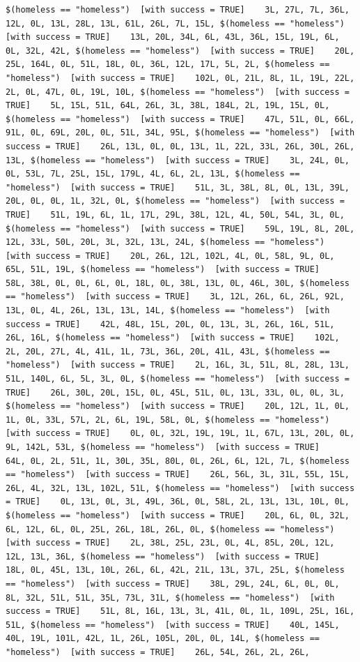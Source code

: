 \documentclass{tufte-book}\usepackage[]{graphicx}\usepackage[]{xcolor}
\makeatletter
\newenvironment{kframe}{%
 \def\at@end@of@kframe{}%
 \ifinner\ifhmode%
  \def\at@end@of@kframe{\end{minipage}}%
  \begin{minipage}{\columnwidth}%
 \fi\fi%
 \def\FrameCommand##1{\hskip\@totalleftmargin \hskip-\fboxsep
 \colorbox{shadecolor}{##1}\hskip-\fboxsep
     \hskip-\linewidth \hskip-\@totalleftmargin \hskip\columnwidth}%
 \MakeFramed {\advance\hsize-\width
   \@totalleftmargin\z@ \linewidth\hsize
   \@setminipage}}%
 {\par\unskip\endMakeFramed%
 \at@end@of@kframe}
\newenvironment{knitrout}{}{} %
\makeatother
\begin{document}
\begin{knitrout}
\begin{kframe}
\begin{verbatim}
$(homeless == "homeless")  [with success = TRUE]    3L, 27L, 7L, 36L, 12L, 0L, 13L, 28L, 13L, 61L, 26L, 7L, 15L, $(homeless == "homeless")  [with success = TRUE]    13L, 20L, 34L, 6L, 43L, 36L, 15L, 19L, 6L, 0L, 32L, 42L, $(homeless == "homeless")  [with success = TRUE]    20L, 25L, 164L, 0L, 51L, 18L, 0L, 36L, 12L, 17L, 5L, 2L, $(homeless == "homeless")  [with success = TRUE]    102L, 0L, 21L, 8L, 1L, 19L, 22L, 2L, 0L, 47L, 0L, 19L, 10L, $(homeless == "homeless")  [with success = TRUE]    5L, 15L, 51L, 64L, 26L, 3L, 38L, 184L, 2L, 19L, 15L, 0L, $(homeless == "homeless")  [with success = TRUE]    47L, 51L, 0L, 66L, 91L, 0L, 69L, 20L, 0L, 51L, 34L, 95L, $(homeless == "homeless")  [with success = TRUE]    26L, 13L, 0L, 0L, 13L, 1L, 22L, 33L, 26L, 30L, 26L, 13L, $(homeless == "homeless")  [with success = TRUE]    3L, 24L, 0L, 0L, 53L, 7L, 25L, 15L, 179L, 4L, 6L, 2L, 13L, $(homeless == "homeless")  [with success = TRUE]    51L, 3L, 38L, 8L, 0L, 13L, 39L, 20L, 0L, 0L, 1L, 32L, 0L, $(homeless == "homeless")  [with success = TRUE]    51L, 19L, 6L, 1L, 17L, 29L, 38L, 12L, 4L, 50L, 54L, 3L, 0L, $(homeless == "homeless")  [with success = TRUE]    59L, 19L, 8L, 20L, 12L, 33L, 50L, 20L, 3L, 32L, 13L, 24L, $(homeless == "homeless")  [with success = TRUE]    20L, 26L, 12L, 102L, 4L, 0L, 58L, 9L, 0L, 65L, 51L, 19L, $(homeless == "homeless")  [with success = TRUE]    58L, 38L, 0L, 0L, 6L, 0L, 18L, 0L, 38L, 13L, 0L, 46L, 30L, $(homeless == "homeless")  [with success = TRUE]    3L, 12L, 26L, 6L, 26L, 92L, 13L, 0L, 4L, 26L, 13L, 13L, 14L, $(homeless == "homeless")  [with success = TRUE]    42L, 48L, 15L, 20L, 0L, 13L, 3L, 26L, 16L, 51L, 26L, 16L, $(homeless == "homeless")  [with success = TRUE]    102L, 2L, 20L, 27L, 4L, 41L, 1L, 73L, 36L, 20L, 41L, 43L, $(homeless == "homeless")  [with success = TRUE]    2L, 16L, 3L, 51L, 8L, 28L, 13L, 51L, 140L, 6L, 5L, 3L, 0L, $(homeless == "homeless")  [with success = TRUE]    26L, 30L, 20L, 15L, 0L, 45L, 51L, 0L, 13L, 33L, 0L, 0L, 3L, $(homeless == "homeless")  [with success = TRUE]    20L, 12L, 1L, 0L, 1L, 0L, 33L, 57L, 2L, 6L, 19L, 58L, 0L, $(homeless == "homeless")  [with success = TRUE]    0L, 0L, 32L, 19L, 19L, 1L, 67L, 13L, 20L, 0L, 9L, 142L, 53L, $(homeless == "homeless")  [with success = TRUE]    64L, 0L, 2L, 51L, 1L, 30L, 35L, 80L, 0L, 26L, 6L, 12L, 7L, $(homeless == "homeless")  [with success = TRUE]    26L, 56L, 3L, 31L, 55L, 15L, 26L, 4L, 32L, 13L, 102L, 51L, $(homeless == "homeless")  [with success = TRUE]    0L, 13L, 0L, 3L, 49L, 36L, 0L, 58L, 2L, 13L, 13L, 10L, 0L, $(homeless == "homeless")  [with success = TRUE]    20L, 6L, 0L, 32L, 6L, 12L, 6L, 0L, 25L, 26L, 18L, 26L, 0L, $(homeless == "homeless")  [with success = TRUE]    2L, 38L, 25L, 23L, 0L, 4L, 85L, 20L, 12L, 12L, 13L, 36L, $(homeless == "homeless")  [with success = TRUE]    18L, 0L, 45L, 13L, 10L, 26L, 6L, 42L, 21L, 13L, 37L, 25L, $(homeless == "homeless")  [with success = TRUE]    38L, 29L, 24L, 6L, 0L, 0L, 8L, 32L, 51L, 51L, 35L, 73L, 31L, $(homeless == "homeless")  [with success = TRUE]    51L, 8L, 16L, 13L, 3L, 41L, 0L, 1L, 109L, 25L, 16L, 51L, $(homeless == "homeless")  [with success = TRUE]    40L, 145L, 40L, 19L, 101L, 42L, 1L, 26L, 105L, 20L, 0L, 14L, $(homeless == "homeless")  [with success = TRUE]    26L, 54L, 26L, 2L, 26L, 
\end{verbatim}
\end{kframe}
\end{knitrout}
\end{document}
